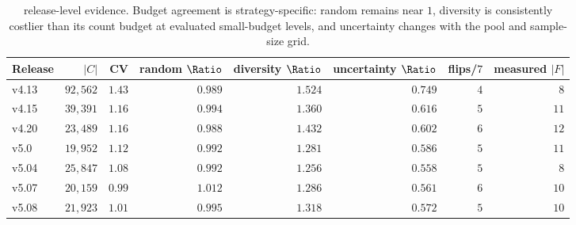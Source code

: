 \begin{table}[t]
\centering
\caption{\StudyLinux release-level evidence. Budget agreement is
strategy-specific: random remains near $1$, diversity is consistently costlier
than its count budget at evaluated small-budget levels, and uncertainty changes
with the pool and sample-size grid.}
\label{tab:app-linux-releases}
\footnotesize
\setlength{\tabcolsep}{4pt}
\begin{tabular}{l r r r r r r r}
\toprule
Release & $|C|$ & CV & random $\Ratio$ & diversity $\Ratio$ & uncertainty $\Ratio$ & flips/$7$ & measured $|F|$ \\
\midrule
v4.13 & $92{,}562$ & $1.43$ & $0.989$ & $1.524$ & $0.749$ & $4$ & $8$ \\
v4.15 & $39{,}391$ & $1.16$ & $0.994$ & $1.360$ & $0.616$ & $5$ & $11$ \\
v4.20 & $23{,}489$ & $1.16$ & $0.988$ & $1.432$ & $0.602$ & $6$ & $12$ \\
v5.0 & $19{,}952$ & $1.12$ & $0.992$ & $1.281$ & $0.586$ & $5$ & $11$ \\
v5.04 & $25{,}847$ & $1.08$ & $0.992$ & $1.256$ & $0.558$ & $5$ & $8$ \\
v5.07 & $20{,}159$ & $0.99$ & $1.012$ & $1.286$ & $0.561$ & $6$ & $10$ \\
v5.08 & $21{,}923$ & $1.01$ & $0.995$ & $1.318$ & $0.572$ & $5$ & $10$ \\
\bottomrule
\end{tabular}
\end{table}

